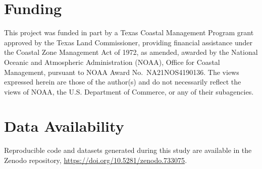 \documentclass[fleqn,10pt,lineno]{wlpeerj} %
\begin{document}
\hypertarget{funding}{%
\section*{Funding}\label{funding}}

This project was funded in part by a Texas Coastal Management Program
grant approved by the Texas Land Commissioner, providing financial
assistance under the Coastal Zone Management Act of 1972, as amended,
awarded by the National Oceanic and Atmospheric Administration (NOAA),
Office for Coastal Management, pursuant to NOAA Award
No.~NA21NOS4190136. The views expressed herein are those of the
author(s) and do not necessarily reflect the views of NOAA, the U.S.
Department of Commerce, or any of their subagencies.

\hypertarget{data-availability}{%
\section*{Data Availability}\label{data-availability}}

Reproducible code and datasets generated during this study are available
in the Zenodo repository, \url{https://doi.org/10.5281/zenodo.733075}.

\printbibliography
\end{document}
